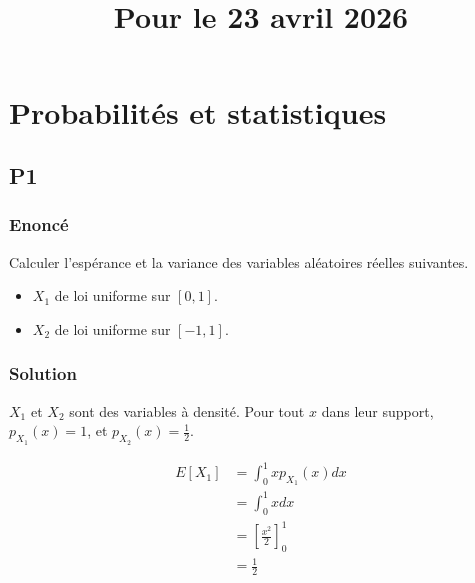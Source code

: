 \documentclass[
10pt, %
a4paper, %
oneside, %
headinclude,footinclude, %
BCOR5mm, %
]{scrartcl}
\title{\normalfont{FTML Exercices 1 solutions}\\
\large{Pour le 23 avril 2026}
}
\author{\spacedlowsmallcaps{}
}
\date{}
\begin{document}
\renewcommand{\sectionmark}[1]{\markright{\spacedlowsmallcaps{#1}}}
\lehead{\mbox{\llap{\small\thepage\kern1em\color{halfgray} \vline}\color{halfgray}\hspace{0.5em}\rightmark\hfil}} 
\pagestyle{scrheadings}
\maketitle 
\setcounter{tocdepth}{3} 

\tableofcontents

\section{\large\color{Blue}Probabilités et statistiques}

\subsection{\color{MidnightBlue}P1}

\subsubsection{Enoncé}
\label{par:enoncé}

Calculer l'espérance et la variance des variables aléatoires réelles suivantes.
\begin{itemize}
    \item $X_1$ de loi uniforme sur $[0, 1]$.
    \item $X_2$ de loi uniforme sur $[-1, 1]$.
\end{itemize}

\subsubsection{Solution}


$X_1$ et $X_2$ sont des variables à densité. Pour tout $x$ dans leur support,
$p_{X_1}(x) = 1$, et $p_{X_2}(x) = \frac{1}{2} $.

\begin{equation}
    \begin{aligned}
        \label{eq:}
        E[X_1] &= \int^{1}_{0} x p_{X_1}(x) dx \\
        &= \int^{1}_{0} x  dx \\
        &= [ \frac{x^2}{2} ]^1_0\\
        &= \frac{1}{2} 
    \end{aligned}
\end{equation}
\end{document}
